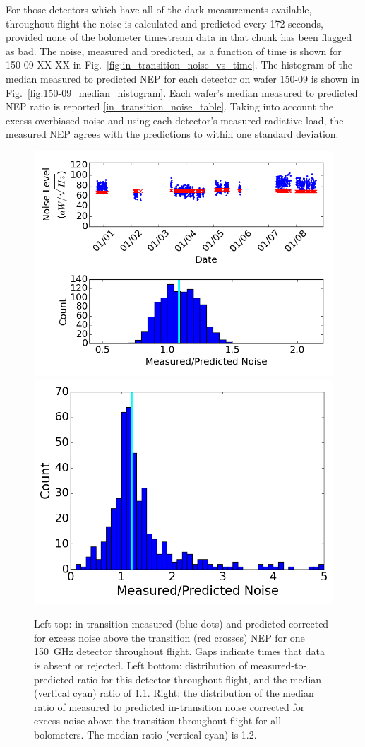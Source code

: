 For those detectors which have all of the dark measurements available, throughout flight the noise is calculated and predicted every 172 seconds, provided none of the bolometer timestream data in that chunk has been flagged as bad. 
The noise, measured and predicted, as a function of time is shown for 150-09-XX-XX in Fig.~\ref{fig:in_transition_noise_vs_time}. 
The histogram of the median measured to predicted \ac{NEP} for each detector on wafer 150-09 is shown in Fig.~\ref{fig:150-09_median_histogram}.
Each wafer's median measured to predicted \ac{NEP} ratio is reported \TAB\ref{in_transition_noise_table}. 
Taking into account the excess overbiased noise and using each detector's measured radiative load, the measured \ac{NEP} agrees with the predictions to within one standard deviation. 





\begin{figure}[ht!]
\begin{center}
\includegraphics[width=0.48\columnwidth]{figures/board68_wire2_ch06_transition.png}
\includegraphics[width=0.48\columnwidth]{figures/in_transition_histogram.png}
\caption{Left top: in-transition measured (blue dots) and predicted corrected for excess noise above the transition (red crosses) \ac{NEP} for one 150~GHz detector 
throughout flight. Gaps indicate times that data is absent or rejected. 
Left bottom: distribution 
of measured-to-predicted ratio for this detector throughout flight, and the median (vertical cyan) ratio of 1.1.
Right: the distribution of the median ratio of measured to predicted in-transition noise corrected for excess noise above the transition throughout flight for all bolometers.
The median ratio (vertical cyan) is 1.2. 
\label{fig:in_transition_noise} }
\end{center}
\end{figure}



